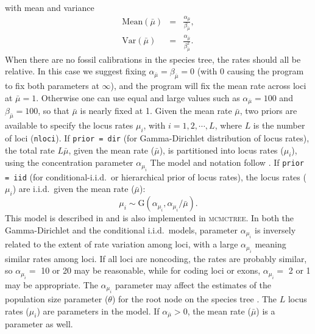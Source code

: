 \documentclass[11pt]{article}
\begin{document}
with mean and variance
\begin{eqnarray}
	\textrm{Mean}(\bar{\mu}) & = & \frac{\alpha_{\bar{\mu}}}{\beta_{\bar{\mu}}}, \nonumber \\
	\textrm{Var}(\bar{\mu}) & = & \frac{\alpha_{\bar{\mu}}}{\beta_{\bar{\mu}}^2}. \nonumber 
\end{eqnarray}
When there are no fossil calibrations in the species tree, the rates
should all be relative.  In this case we suggest fixing
$\alpha_{\bar{\mu}}=\beta_{\bar{\mu}}=0$ (with 0 causing the program
to fix both parameters at $\infty$), and the program will fix the mean
rate across loci at $\bar\mu = 1$.  Otherwise one can use equal and
large values such as $\alpha_{\bar{\mu}}=100$ and
$\beta_{\bar{\mu}}=100$, so that $\bar\mu$ is nearly fixed at 1.
Given the mean rate $\bar\mu$, two priors are available to specify the
locus rates $\mu_i$, with $i = 1, 2, \cdots, L$, where $L$ is the
number of loci (\texttt{nloci}).  If \texttt{prior = dir} (for
Gamma-Dirichlet distribution of locus rates), the total rate
$L\bar\mu$, given the mean rate ($\bar\mu$), is partitioned into locus
rates ($\mu_i$), using the concentration parameter $\alpha_{\mu_i}$
The model and notation follow %
\citet[][eqs.~3-5]{dosReis2014}.  If \texttt{prior = iid} (for
conditional-i.i.d.\ or hierarchical prior of locus rates), the locus
rates ($\mu_i$) are i.i.d.\ given the mean rate ($\bar\mu$):
\begin{displaymath}
	\mu_i \sim \mathrm{G}(\alpha_{\mu_i},\alpha_{\mu_i}/\bar{\mu}).
\end{displaymath}
This model is described in \citet[][eq.~8]{Zhu2015} 
and is also
implemented in \textsc{mcmctree}.  In both the Gamma-Dirichlet and the
conditional i.i.d.\ models, parameter $\alpha_{\mu_i}$ is inversely
related to the extent of rate variation among loci, with a large
$\alpha_{\mu_i}$ meaning similar rates among loci.  If all loci are
noncoding, the rates are probably similar, so $\alpha_{\mu_i} =$ 10 or
20 may be reasonable, while for coding loci or exons,
$\alpha_{\mu_i} =$ 2 or 1 may be appropriate.  The $\alpha_{\mu_i}$
parameter may affect the estimates of the population size parameter
($\theta$) for the root node on the species tree \citep{Burgess2008}.
The $L$ locus rates ($\mu_i$) are parameters in the model.  If
$\alpha_{\bar{\mu}} > 0$, the mean rate ($\bar\mu$) is a parameter as
well.
\end{document}

